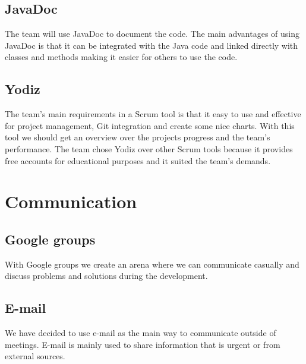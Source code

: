 \subsection{JavaDoc}
The team will use JavaDoc to document the code. The main advantages of using JavaDoc is that it can be integrated with the Java code and linked directly with classes and methods making it easier for others to use the code.

\subsection{Yodiz}
The team's main requirements in a Scrum tool is that it easy to use and effective for project management, Git integration and create some nice charts. With this tool we should get an overview over the projects progress and the team's performance. The team chose Yodiz over other Scrum tools because it provides free accounts for educational purposes and it suited the team's demands. 

\section{Communication}
\subsection{Google groups}
With Google groups we create an arena where we can communicate casually and discuss problems and solutions during the development.

\subsection{E-mail}
We have decided to use e-mail as the main way to communicate outside of meetings. E-mail is mainly used to share information that is urgent or from external sources.


